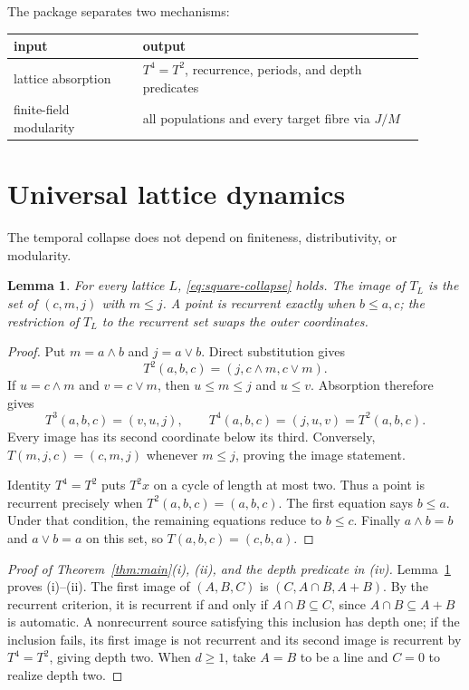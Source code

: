 \documentclass[a4paper,10pt]{amsart}
\newtheorem{lemma}[theorem]{Lemma}
\theoremstyle{remark}
\newcommand{\meet}{\mathbin{\cap}}
\newcommand{\join}{\mathbin{+}}
\begin{document}
The package separates two mechanisms:
\begin{center}
\small
\begin{tabular}{>{\raggedright\arraybackslash}p{0.29\linewidth}
                >{\raggedright\arraybackslash}p{0.61\linewidth}}
\toprule
input & output \\
\midrule
lattice absorption & $T^4=T^2$, recurrence, periods, and depth predicates \\
finite-field modularity & all populations and every target fibre via $J/M$ \\
\bottomrule
\end{tabular}
\end{center}

\section{Universal lattice dynamics}

The temporal collapse does not depend on finiteness, distributivity, or
modularity.

\begin{lemma}\label{lem:universal}
For every lattice $L$, \eqref{eq:square-collapse} holds.  The image of $T_L$
is the set of $(c,m,j)$ with $m\le j$.  A point is recurrent exactly when
$b\le a,c$; the restriction of $T_L$ to the recurrent set swaps the outer
coordinates.
\end{lemma}

\begin{proof}
Put $m=a\wedge b$ and $j=a\vee b$.  Direct substitution gives
\begin{equation}\label{eq:square}
             T^2(a,b,c)=(j,c\wedge m,c\vee m).
\end{equation}
If $u=c\wedge m$ and $v=c\vee m$, then $u\le m\le j$ and $u\le v$.
Absorption therefore gives
\[
             T^3(a,b,c)=(v,u,j),\qquad
             T^4(a,b,c)=(j,u,v)=T^2(a,b,c).
\]
Every image has its second coordinate below its third.  Conversely,
$T(m,j,c)=(c,m,j)$ whenever $m\le j$, proving the image statement.

Identity $T^4=T^2$ puts $T^2x$ on a cycle of length at most two.  Thus a
point is recurrent precisely when $T^2(a,b,c)=(a,b,c)$.  The first equation
says $b\le a$.  Under that condition, the remaining equations reduce to
$b\le c$.  Finally $a\wedge b=b$ and $a\vee b=a$ on this set, so
$T(a,b,c)=(c,b,a)$.
\end{proof}

\begin{proof}[Proof of Theorem~\ref{thm:main}(i), (ii), and the depth
predicate in (iv)]
Lemma~\ref{lem:universal} proves (i)--(ii).  The first image of $(A,B,C)$ is
$(C,A\meet B,A\join B)$.  By the recurrent criterion, it is recurrent if
and only if $A\meet B\subseteq C$, since
$A\meet B\subseteq A\join B$ is automatic.  A nonrecurrent source satisfying
this inclusion has depth one; if the inclusion fails, its first image is not
recurrent and its second image is recurrent by $T^4=T^2$, giving depth two.
When $d\ge1$, take $A=B$ to be a line and $C=0$ to realize depth two.
\end{proof}
\end{document}
